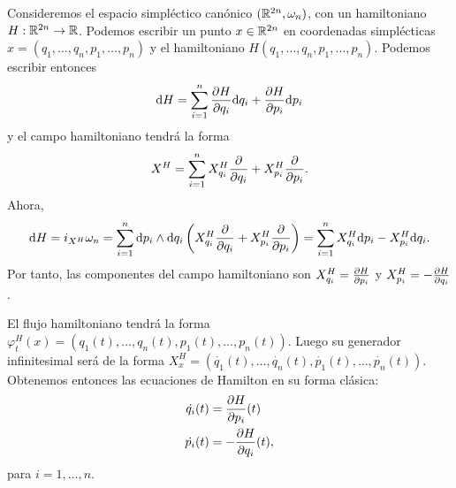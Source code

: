 \begin{ejemplo}
  Consideremos el espacio simpléctico canónico $(\mathbb{R}^{2n},\omega_n)$, con un hamiltoniano $H:\mathbb{R}^{2n}\rightarrow \mathbb{R}$. Podemos escribir un punto $x\in \mathbb{R}^{2n}$ en coordenadas simplécticas $x = (q_1,\dots,q_n,p_1,\dots,p_n)$ y el hamiltoniano $H(q_1,\dots,q_n,p_1,\dots,p_n)$. Podemos escribir entonces
  \begin{equation*}
    \mathrm{d} H = \sum_{i=1}^n \frac{\partial H}{\partial q_i} \mathrm{d}{q_i} + \frac{\partial H}{\partial p_i} \mathrm{d}{p_i}
  \end{equation*}
  y el campo hamiltoniano tendrá la forma
  \begin{equation*}
    X^H = \sum_{i=1}^n X_{q_i}^H \frac{\partial}{\partial q_i} + X_{p_i}^H \frac{\partial}{\partial p_i}.
  \end{equation*}
  Ahora, 
  \begin{equation*}
    \mathrm{d} H = i_{X^H}\omega_n = \sum_{i=1}^n \mathrm{d} p_i \wedge \mathrm{d} q_i \left(X_{q_i}^H \frac{\partial}{\partial q_i} + X^H_{p_i} \frac{\partial}{\partial p_i}\right)  = \sum_{i=1}^n X_{q_i}^H \mathrm{d} p_i -X_{p_i}^H \mathrm{d} q_i.
  \end{equation*}
  Por tanto, las componentes del campo hamiltoniano son $X^H_{q_i}=\frac{\partial H}{\partial p_i}$ y $X^H_{p_i}=-\frac{\partial H}{\partial q_i}$.

  El flujo hamiltoniano tendrá la forma $\varphi^H_t(x) = (q_1(t),\dots,q_n(t),p_1(t),\dots,p_n(t))$. Luego su generador infinitesimal será de la forma $X^H_x=(\dot{q_1}(t),\dots,\dot{q_n}(t),\dot{p_1}(t),\dots,\dot{p_n}(t))$. Obtenemos entonces las ecuaciones de Hamilton en su forma clásica:
  \begin{align*}
     \dot{q_i}(t) & = \frac{\partial H}{\partial p_i}(t) \\
     \dot{p_i}(t) & = -\frac{\partial H}{\partial q_i} (t),
  \end{align*}
  para $i=1,\dots,n$.
\end{ejemplo}

